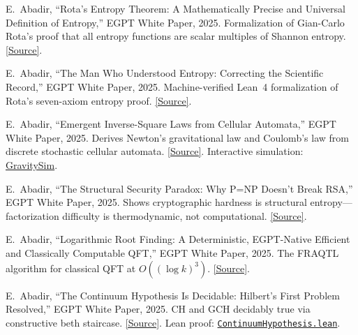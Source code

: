 \documentclass[11pt,a4paper]{article}
\begin{document}
\begin{enumerate}[label={[\arabic*]}, leftmargin=*, itemsep=2pt]
    \item \label{ref:ret_paper} E.~Abadir, ``Rota's Entropy Theorem: A Mathematically Precise and Universal Definition of Entropy,'' EGPT White Paper, 2025. Formalization of Gian-Carlo Rota's proof that all entropy functions are scalar multiples of Shannon entropy. \href{https://eabadir.github.io/EGPT/content/Papers/RET_Paper/Rota_Entropy_Theorem_Original_Proof.tex}{[Source]}.

    \item \label{ref:man_entropy} E.~Abadir, ``The Man Who Understood Entropy: Correcting the Scientific Record,'' EGPT White Paper, 2025. Machine-verified Lean~4 formalization of Rota's seven-axiom entropy proof. \href{https://eabadir.github.io/EGPT/content/Papers/TheManWhoUnderstoodEntropy/TheManWhoUnderstoodEntropy.tex}{[Source]}.

    \item \label{ref:gravity_paper} E.~Abadir, ``Emergent Inverse-Square Laws from Cellular Automata,'' EGPT White Paper, 2025. Derives Newton's gravitational law and Coulomb's law from discrete stochastic cellular automata. \href{https://eabadir.github.io/EGPT/content/Papers/GravityPaper/GravityPaper.tex}{[Source]}. Interactive simulation: \href{https://eabadir.github.io/EGPT/www/GravitySim/index.html}{GravitySim}.

    \item \label{ref:crypto_paper} E.~Abadir, ``The Structural Security Paradox: Why P=NP Doesn't Break RSA,'' EGPT White Paper, 2025. Shows cryptographic hardness is structural entropy---factorization difficulty is thermodynamic, not computational. \href{https://eabadir.github.io/EGPT/content/Papers/AddressMap_And_Crypto/Structural_Security_Of_Crypto_When_PeqNP.tex}{[Source]}.

    \item \label{ref:fraqtl_wp} E.~Abadir, ``Logarithmic Root Finding: A Deterministic, EGPT-Native Efficient and Classically Computable QFT,'' EGPT White Paper, 2025. The FRAQTL algorithm for classical QFT at $O((\log k)^3)$. \href{https://eabadir.github.io/EGPT/content/pyFRAQTL/FRAQTL_WhitePaper.md}{[Source]}.

    \item \label{ref:ch_paper} E.~Abadir, ``The Continuum Hypothesis Is Decidable: Hilbert's First Problem Resolved,'' EGPT White Paper, 2025. CH and GCH decidably true via constructive beth staircase. \href{https://eabadir.github.io/EGPT/content/Papers/ContinuumHypothesis/ContinuumHypothesis.tex}{[Source]}. Lean proof: \href{https://eabadir.github.io/EGPT/Lean/EGPT/NumberTheory/ContinuumHypothesis.lean}{\texttt{ContinuumHypothesis.lean}}.
\end{enumerate}
\end{document}
